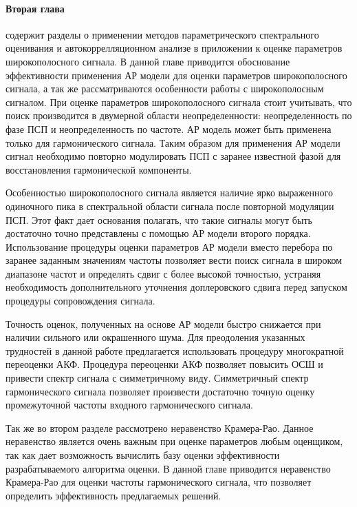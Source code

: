 \paragraph{Вторая глава} содержит разделы о применении методов параметрического спектрального оценивания и автокоррелляционном анализе в приложении к оценке
параметров широкополосного сигнала. В данной главе приводится обоснование эффективности применения АР модели для оценки параметров широкополосного сигнала,
а так же рассматриваются особенности работы с широкополосным сигналом. При оценке параметров широкополосного сигнала стоит учитывать,
что поиск производится в двумерной области неопределенности: неопределенность по фазе ПСП и неопределенность по частоте.
АР модель может быть применена только для гармонического сигнала. Таким образом для применения АР модели сигнал необходимо повторно модулировать ПСП
с заранее известной фазой для восстановления гармонической компоненты.

Особенностью широкополосного сигнала является наличие ярко выраженного одиночного пика в спектральной области сигнала после повторной модуляции ПСП. 
Этот факт дает основания полагать, что такие сигналы могут быть достаточно точно представлены с помощью АР модели второго порядка.
Использование процедуры оценки параметров АР модели вместо перебора по заранее заданным значениям частоты позволяет вести поиск сигнала
в широком диапазоне частот и определять сдвиг с более высокой точностью, устраняя необходимость дополнительного уточнения
доплеровского сдвига перед запуском процедуры сопровождения сигнала.

Точность оценок, полученных на основе АР модели быстро снижается при наличии сильного или окрашенного шума. Для преодоления указанных
трудностей в данной работе предлагается использовать процедуру многократной переоценки АКФ. Процедура переоценки АКФ позволяет
повысить ОСШ и привести спектр сигнала с симметричному виду. Симметричный спектр гармонического сигнала позволяет произвести
достаточно точную оценку промежуточной частоты входного гармонического сигнала.

Так же во втором разделе рассмотрено неравенство Крамера-Рао. Данное неравенство является очень важным при оценке параметров любым
оценщиком, так как дает возможность вычислить базу оценки эффективности разрабатываемого алгоритма оценки. В данной главе
приводится неравенство Крамера-Рао для оценки частоты гармонического сигнала, что позволяет определить эффективность
предлагаемых решений.
